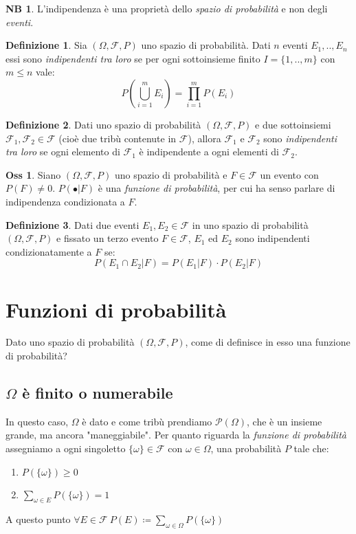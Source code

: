 \documentclass[12pt, a4paper]{report}
\theoremstyle{definition}
\newtheorem{definition}{Definizione}[section]
\newtheorem*{observation}{Oss}
\newtheorem*{note}{NB}
\DeclareRobustCommand{\F}{\mathcal{F}}%
\DeclareRobustCommand{\powerset}{\mathcal{P}(\Omega)}
\DeclareRobustCommand{\probspace}{(\Omega,\F,P)}
\begin{document}
\begin{note}
	L'indipendenza è una proprietà dello \emph{spazio di probabilità} e non
	degli \emph{eventi}.
\end{note}

\newpage
\begin{definition}
	Sia $\probspace$ uno spazio di probabilità. Dati $n$ eventi \(E_1,..,E_n\)
	essi sono \emph{indipendenti tra loro} se per ogni sottoinsieme finito
	\(I=\{1,..,m\}\) con \(m\leq n\) vale:
	\[P\left(\bigcup_{i=1}^m E_i\right)=\prod_{i=1}^m P(E_i)\]
\end{definition}

\begin{definition}
	Dati uno spazio di probabilità $\probspace$ e due sottoinsiemi \(\F_1,\F_2
	\in\F\) (cioè due tribù contenute in $\F$), allora $\F_1$ e $\F_2$ sono
	\emph{indipendenti tra loro} se ogni elemento di $\F_1$ è indipendente a
	ogni elementi di $\F_2$.
\end{definition}

\begin{observation}
	Siano $\probspace$ uno spazio di probabilità e \(F\in\F\) un evento con
	\(P(F)\neq0\). \(P(\bullet|F)\) è una \emph{funzione di probabilità}, per cui
	ha senso parlare di indipendenza condizionata a $F$.
\end{observation}
\begin{definition}
	Dati due eventi \(E_1,E_2\in\F\) in uno spazio di probabilità $\probspace$ e
	fissato un terzo evento \(F\in\F\), $E_1$ ed $E_2$ sono indipendenti
	condizionatamente a $F$ se:
	\[P(E_1\cap E_2|F)=P(E_1|F)\cdot P(E_2|F)\]
\end{definition}

\chapter{Funzioni di probabilità}

Dato uno spazio di probabilità $\probspace$, come di definisce in esso una
funzione di probabilità?

\section{$\Omega$ è finito o numerabile}
In questo caso, $\Omega$ è dato e come tribù prendiamo $\powerset$, che è un
insieme grande, ma ancora "maneggiabile". Per quanto riguarda la 
\emph{funzione di probabilità} assegniamo a ogni singoletto \(\{\omega\}\in\F\)
con \(\omega\in\Omega\), una probabilità $P$ tale che:
\begin{enumerate}[label=(\roman*)]
	\item \(P(\{\omega\})\geq0\)
	\item \(\sum_{\omega\in E}P(\{\omega\})=1\)
\end{enumerate}
A questo punto \(\forall E\in\F\ P(E)\coloneqq\sum_{\omega\in\Omega}P(\{\omega\})\)
\end{document}
